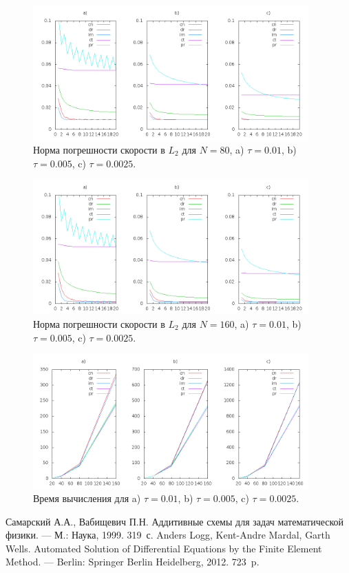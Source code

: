 \documentclass[12pt]{article}
\begin{document}
\begin{figure}
	\begin{center}
		\includegraphics[width=400px]{data160/error_3}
		\caption{Норма погрешности скорости в $L_2$ для $N=80$, a) $\tau=0.01$, b) $\tau=0.005$, c) $\tau=0.0025$.}
		\label{fg:scheme-L2-3}
	\end{center}
\end{figure}

\begin{figure}
	\begin{center}
		\includegraphics[width=400px]{data160/error_4}
		\caption{Норма погрешности скорости в $L_2$ для $N=160$, a) $\tau=0.01$, b) $\tau=0.005$, c) $\tau=0.0025$.}
		\label{fg:scheme-L2-4}
	\end{center}
\end{figure}

\begin{figure}
	\begin{center}
		\includegraphics[width=400px]{data160/scheme-time}
		\caption{Время вычисления для a) $\tau=0.01$, b) $\tau=0.005$, c) $\tau=0.0025$.}
		\label{fg:scheme-time}
	\end{center}
\end{figure}

\begin{thebibliography}{9}
 Самарский А.А., Вабищевич П.Н. Аддитивные схемы для задач математической физики. \newblock --- М.: Наука, 1999. 319~с.
 Anders Logg, Kent-Andre Mardal, Garth Wells. Automated Solution of Differential Equations by the Finite Element Method. \newblock --- Berlin: Springer Berlin Heidelberg, 2012. 723~p.
\end{thebibliography}
\end{document}

